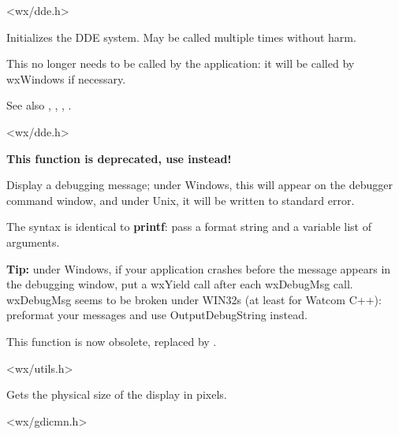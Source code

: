 
<wx/dde.h>

\label{wxddeinitialize}


Initializes the DDE system. May be called multiple times without harm.

This no longer needs to be called by the application: it will be called
by wxWindows if necessary.

See also , , , 
.


<wx/dde.h>

\label{wxdebugmsg}


{\bf This function is deprecated, use  instead!}

Display a debugging message; under Windows, this will appear on the
debugger command window, and under Unix, it will be written to standard
error.

The syntax is identical to {\bf printf}: pass a format string and a
variable list of arguments.

{\bf Tip:} under Windows, if your application crashes before the
message appears in the debugging window, put a wxYield call after
each wxDebugMsg call. wxDebugMsg seems to be broken under WIN32s
(at least for Watcom C++): preformat your messages and use OutputDebugString
instead.

This function is now obsolete, replaced by .


<wx/utils.h>



Gets the physical size of the display in pixels.


<wx/gdicmn.h>

\label{wxenabletoplevelwindows}


